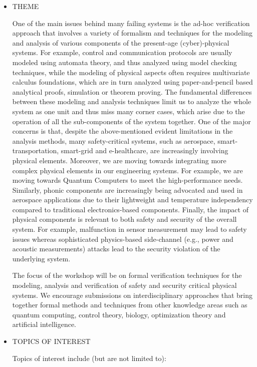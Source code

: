 \documentclass[prodmode,acmtecs]{acmsmall} %
\begin{document}
\begin{itemize}\item  THEME 
 
  One of the main issues behind many failing systems is the ad-hoc verification approach that involves a variety of formalism and techniques for the modeling and analysis of various components of the present-age (cyber)-physical systems. For example, control and communication protocols are usually modeled using automata theory, and thus analyzed using model checking techniques, while the modeling of physical aspects often requires multivariate calculus foundations, which are in turn analyzed using paper-and-pencil based analytical proofs, simulation or theorem proving. The fundamental differences between these modeling and analysis techniques limit us to analyze the whole system as one unit and thus miss many corner cases, which arise due to the operation of all the sub-components of the system together. One of the major concerns is that, despite the above-mentioned evident limitations in the analysis methods, many safety-critical systems, such as aerospace, smart-transportation, smart-grid and e-healthcare, are increasingly involving physical elements. Moreover, we are moving towards integrating more complex physical elements in our engineering systems. For example, we are moving towards Quantum Computers to meet the high-performance needs. Similarly, phonic components are increasingly being advocated and used in aerospace applications due to their lightweight and temperature independency compared to traditional electronics-based components. Finally, the impact of physical components is relevant to both safety and security of the overall system. For example, malfunction in sensor measurement may lead to safety issues whereas sophisticated physics-based side-channel (e.g., power and acoustic measurements) attacks lead to the security violation of the underlying system.  
 
  The focus of the workshop will be on formal verification techniques for the modeling, analysis and verification of safety and security critical physical systems. We encourage submissions on interdisciplinary approaches that bring together formal methods and techniques from other knowledge areas such as quantum computing, control theory, biology, optimization theory and artificial intelligence.  
 
\item  TOPICS OF INTEREST 
 
  Topics of interest include (but are not limited to): 
 

\end{itemize}
\end{document}
